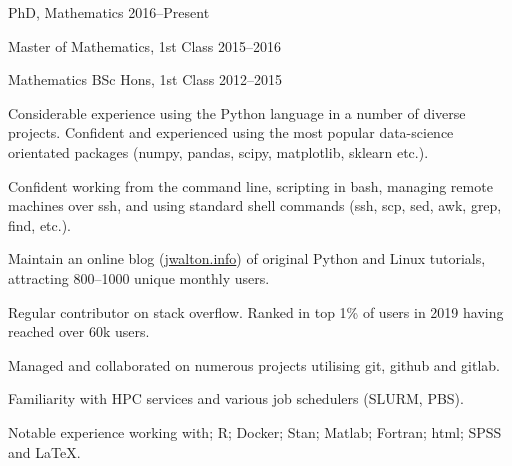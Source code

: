 \documentclass[12pt, a4paper]{article}
\begin{document}



\printdetails







%
        {PhD, Mathematics}%
        {2016--Present}

%
        {Master of Mathematics, 1st Class}%
        {2015--2016}

%
        {Mathematics BSc Hons, 1st Class}%
        {2012--2015}




%
         {Considerable experience using the Python language in a number of
         diverse projects. Confident and experienced using the most popular
         data-science orientated packages (numpy, pandas, scipy, matplotlib,
         sklearn etc.).}

%
         {Confident working from the command line, scripting in bash, managing
         remote machines over ssh, and using standard shell commands (ssh, scp,
         sed, awk, grep, find, etc.).}

%
         {Maintain an online blog (\href{https://jwalton.info}{jwalton.info}) of
         original Python and Linux tutorials, attracting 800--1000 unique monthly
         users.}

%
         {Regular contributor on stack overflow. Ranked in top 1\% of users in
         2019 having reached over 60k users.}

%
         {Managed and collaborated on numerous projects utilising git, github
         and gitlab.}

%
         {Familiarity with HPC services and various job schedulers (SLURM, PBS).}

%
         {Notable experience working with; R; Docker; Stan; Matlab; Fortran; html; SPSS
         and \LaTeX{}.}
\end{document}
